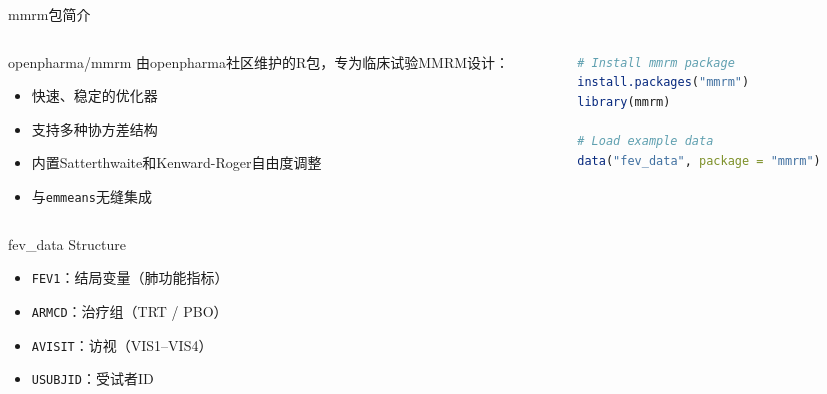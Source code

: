 \documentclass[aspectratio=169,11pt]{beamer}
\begin{document}
\begin{frame}[fragile]{mmrm包简介}
\begin{columns}[T,totalwidth=\textwidth]
\begin{column}{0.50\textwidth}
\begin{block}{openpharma/mmrm}
\footnotesize
由openpharma社区维护的R包，专为临床试验MMRM设计：
\begin{itemize}
    \item 快速、稳定的优化器
    \item 支持多种协方差结构
    \item 内置Satterthwaite和Kenward-Roger自由度调整
    \item 与\texttt{emmeans}无缝集成
\end{itemize}
\end{block}
\end{column}
\begin{column}{0.46\textwidth}
\begin{lstlisting}[language=R,basicstyle=\ttfamily\scriptsize]
# Install mmrm package
install.packages("mmrm")
library(mmrm)

# Load example data
data("fev_data", package = "mmrm")
\end{lstlisting}
\end{column}
\end{columns}

\vspace{0.1cm}
\begin{exampleblock}{\footnotesize fev\_data Structure}
\footnotesize
\begin{itemize}
    \item \texttt{FEV1}：结局变量（肺功能指标）
    \item \texttt{ARMCD}：治疗组（TRT / PBO）
    \item \texttt{AVISIT}：访视（VIS1--VIS4）
    \item \texttt{USUBJID}：受试者ID
\end{itemize}
\end{exampleblock}
\end{frame}
\end{document}
